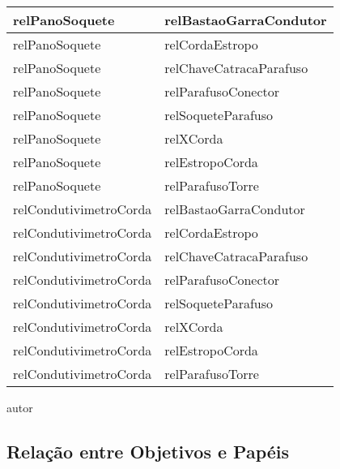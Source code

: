 \begin{center}
\begin{longtable}[H]{|l|l|}
relPanoSoquete                                  & relBastaoGarraCondutor                           \\ \hline
relPanoSoquete                                  & relCordaEstropo                                  \\ \hline
relPanoSoquete                                  & relChaveCatracaParafuso                          \\ \hline
relPanoSoquete                                  & relParafusoConector                              \\ \hline
relPanoSoquete                                  & relSoqueteParafuso                               \\ \hline
relPanoSoquete                                  & relXCorda                                        \\ \hline
relPanoSoquete                                  & relEstropoCorda                                  \\ \hline
relPanoSoquete                                  & relParafusoTorre                                 \\ \hline
relCondutivimetroCorda                          & relBastaoGarraCondutor                           \\ \hline
relCondutivimetroCorda                          & relCordaEstropo                                  \\ \hline
relCondutivimetroCorda                          & relChaveCatracaParafuso                          \\ \hline
relCondutivimetroCorda                          & relParafusoConector                              \\ \hline
relCondutivimetroCorda                          & relSoqueteParafuso                               \\ \hline
relCondutivimetroCorda                          & relXCorda                                        \\ \hline
relCondutivimetroCorda                          & relEstropoCorda                                  \\ \hline
relCondutivimetroCorda                          & relParafusoTorre                                 \\ \hline
\end{longtable}
autor
\end{center}

\subsection{Relação entre Objetivos e Papéis}

